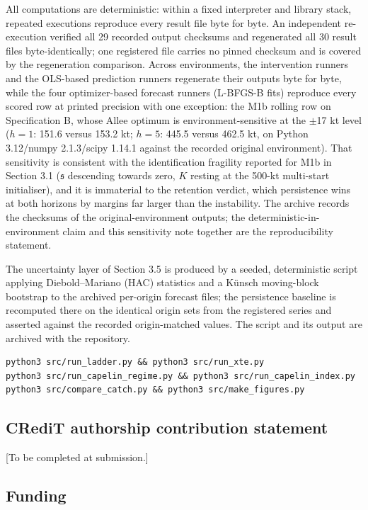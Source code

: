 \documentclass[11pt]{article}
\begin{document}
All computations are deterministic: within a fixed interpreter and
library stack, repeated executions reproduce every result file byte for
byte. An independent re-execution verified all 29 recorded output
checksums and regenerated all 30 result files byte-identically; one
registered file carries no pinned checksum and is covered by the
regeneration comparison. Across environments, the intervention runners
and the OLS-based prediction runners regenerate their outputs byte for
byte, while the four optimizer-based forecast runners (L-BFGS-B fits)
reproduce every scored row at printed precision with one exception: the
M1b rolling row on Specification B, whose Allee optimum is
environment-sensitive at the \ensuremath{\pm}17 kt level (\(h=1\): 151.6
versus 153.2 kt; \(h=5\): 445.5 versus 462.5 kt, on Python
3.12/numpy 2.1.3/scipy 1.14.1 against the recorded original
environment). That sensitivity is consistent with the identification
fragility reported for M1b in Section 3.1 (\(\mathfrak s\) descending
towards zero, \(K\) resting at the 500-kt multi-start initialiser), and
it is immaterial to the retention verdict, which persistence wins at
both horizons by margins far larger than the instability. The archive
records the checksums of the original-environment outputs; the
deterministic-in-environment claim and this sensitivity note together
are the reproducibility statement.

The uncertainty layer of Section 3.5 is produced by a seeded,
deterministic script applying Diebold--Mariano (HAC) statistics and a
K\"unsch moving-block bootstrap to the archived per-origin forecast
files; the persistence baseline is recomputed there on the identical
origin sets from the registered series and asserted against the recorded
origin-matched values. The script and its output are archived with the
repository.

\begin{verbatim}
python3 src/run_ladder.py && python3 src/run_xte.py
python3 src/run_capelin_regime.py && python3 src/run_capelin_index.py
python3 src/compare_catch.py && python3 src/make_figures.py
\end{verbatim}

\subsection*{CRediT authorship contribution statement}

{[}To be completed at submission.{]}

\subsection*{Funding}
\end{document}
